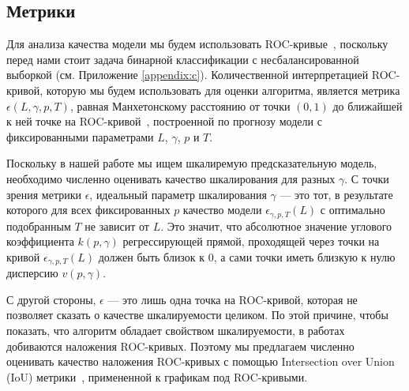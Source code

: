 \subsection{Метрики}

Для анализа качества модели мы будем использовать ROC-кривые~\cite{Molchan1997}, поскольку перед нами стоит задача бинарной классификации с несбалансированной выборкой (см. Приложение \ref{appendix:c}).  Количественной интерпретацией ROC-кривой, которую мы будем использовать для оценки алгоритма, является метрика $\epsilon(L,\gamma,p,T)$, равная Манхетонскому расстоянию от точки $(0, 1)$ до ближайшей к ней точке на ROC-кривой~\cite{Hallerberg2009,Shapoval2006}, построенной по прогнозу модели с фиксированными параметрами $L$, $\gamma$, $p$ и $T$.

Поскольку в нашей работе мы ищем шкалиремую предсказательную модель, необходимо численно оценивать качество шкалирования для разных $\gamma$. С точки зрения метрики $\epsilon$, идеальный параметр шкалирования $\gamma$ --- это тот, в результате которого для всех фиксированных $p$ качество модели $\epsilon_{\gamma,p,T}(L)$ с оптимально подобранным $T$ не зависит от $L$. Это значит, что абсолютное значение углового коэффициента $k(p, \gamma)$ регрессирующей прямой, проходящей через точки на кривой $\epsilon_{\gamma,p,T}(L)$ должен быть близок к $0$, а сами точки иметь близкую к нулю дисперсию $v(p, \gamma)$.

С другой стороны, $\epsilon$ --- это лишь одна точка на ROC-кривой, которая не позволяет сказать о качестве шкалируемости целиком. По этой причине, чтобы показать, что алгоритм обладает свойством шкалируемости, в работах~\cite{deluca,Hallerberg2009} добиваются наложения ROC-кривых. Поэтому мы предлагаем численно оценивать качество наложения ROC-кривых с помощью Intersection over Union (IoU) метрики~\cite{Alhaija2018, Cordts2016, Murphy1996}, примененной к графикам под ROC-кривыми.